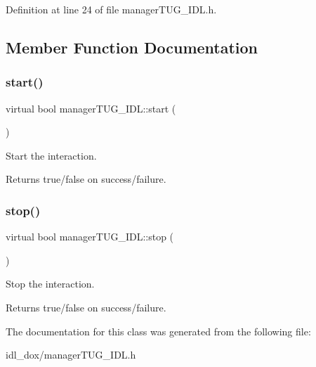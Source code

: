 Definition at line 24 of file manager\+T\+U\+G\+\_\+\+I\+D\+L.\+h.



\subsection{Member Function Documentation}
\mbox{\label{classmanagerTUG__IDL_accbf9248b8f8f7688dba51a324624c0c}} 
\subsubsection{\texorpdfstring{start()}{start()}}
{\footnotesize\ttfamily virtual bool manager\+T\+U\+G\+\_\+\+I\+D\+L\+::start (\begin{DoxyParamCaption}{ }\end{DoxyParamCaption})\hspace{0.3cm}{\ttfamily [virtual]}}



Start the interaction. 

\begin{DoxyReturn}{Returns}
true/false on success/failure. 
\end{DoxyReturn}
\mbox{\label{classmanagerTUG__IDL_a4e4054e0f008e1207c08df67eb92a6ac}} 
\subsubsection{\texorpdfstring{stop()}{stop()}}
{\footnotesize\ttfamily virtual bool manager\+T\+U\+G\+\_\+\+I\+D\+L\+::stop (\begin{DoxyParamCaption}{ }\end{DoxyParamCaption})\hspace{0.3cm}{\ttfamily [virtual]}}



Stop the interaction. 

\begin{DoxyReturn}{Returns}
true/false on success/failure. 
\end{DoxyReturn}


The documentation for this class was generated from the following file\+:\begin{DoxyCompactItemize}
\item 
idl\+\_\+dox/manager\+T\+U\+G\+\_\+\+I\+D\+L.\+h\end{DoxyCompactItemize}
